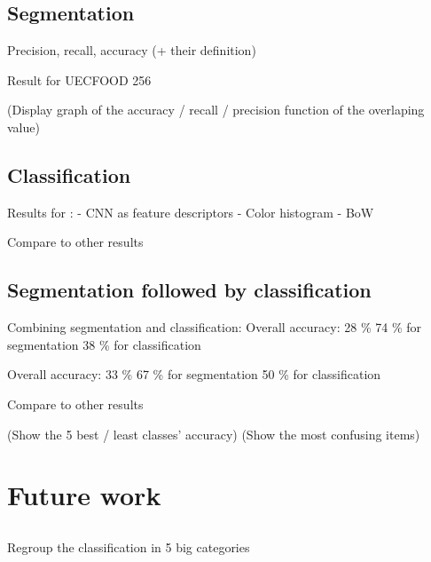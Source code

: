 \documentclass[aspectratio=169]{beamer}
\let\oldsection\section
\renewcommand{\section}[1]{
    \oldsection{#1}	
    \subsection{}
}
\newenvironment{myframe}[1][t]{\begin{frame}[#1]{\secname}{\subsecname}}{\end{frame}}
\begin{document}
    \subsection{Segmentation}
    
    \begin{myframe}
        Precision, recall, accuracy (+ their definition)
        
        Result for UECFOOD 256
        
        (Display graph of the accuracy / recall / precision function of the overlaping value)
    \end{myframe}
    
    \subsection{Classification}
    
    \begin{myframe}
        Results for :
        - CNN as feature descriptors
        - Color histogram
        - BoW
        
        Compare to other results
    \end{myframe}
    
    \subsection{Segmentation followed by classification}
    
    \begin{myframe}
        Combining segmentation and classification:
        Overall accuracy: 28 \%
        74 \% for segmentation
        38 \% for classification
        
        Overall accuracy: 33 \%
        67 \% for segmentation
        50 \% for classification
        
        Compare to other results
        
        (Show the 5 best / least classes' accuracy)
        (Show the most confusing items)
    \end{myframe}
    
    \section{Future work}
    
    \begin{myframe}
        Regroup the classification in 5 big categories
    \end{myframe}
    
\end{document}
